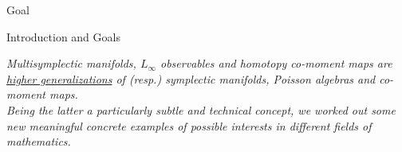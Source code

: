 \documentclass[beamer,handout,10pt]{standalone}
\begin{document}



\begin{frame}{Goal}
		\begin{block}{Introduction and Goals}
			\vspace{0.5em}
			\centering
			\parbox{0.98\linewidth}{%
			\emph{
				{\color{lincolngreen!80!black} Multisymplectic manifolds}, 	
				{\color{norange!80!black}$L_\infty$ observables} and 
				{\color{nred!80!black}homotopy co-moment maps} are 
				\underline{higher generalizations} of (resp.)
				{\color{lincolngreen!80!black} symplectic manifolds}, 
				{\color{norange!80!black} Poisson algebras} and 
				{\color{nred!80!black}co-moment maps}. %
				\\
				Being the latter a particularly subtle and technical concept, 
				we worked out some new meaningful concrete examples of possible interests in different fields of mathematics.
			}
			}
			\vspace{.5em}
		\end{block}
\end{frame}
\end{document}
